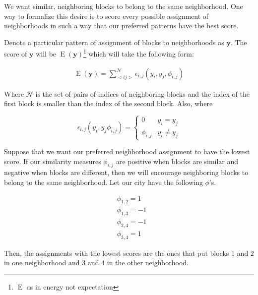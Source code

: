 We want similar, neighboring blocks to belong to the same
neighborhood. One way to formalize this desire is to score every possible
assignment of neighborhoods in such a way that our preferred patterns
have the best score.

Denote a particular pattern of assignment of blocks to neighborhoods
as $\mathbf{y}$.  The score of $\mathbf{y}$ will be
$\operatorname{E}(\mathbf{y})$\footnote{$\operatorname{E}$ as in
  energy not expectation} which will take the following form:

\begin{align}
\operatorname{E}(\mathbf{y}) = \sum_{<i j>}^{\mathcal{N}}\epsilon_{i,j}(y_i,y_j,\phi_{i,j})
\end{align}

Where $\mathcal{N}$ is the set of pairs of indices of neighboring
blocks and the index of the first block is smaller than the index of
the second block. Also, where

\begin{equation}
\epsilon_{i,j}(y_i,y_j\phi_{i,j}) = \begin{cases}
  0 &y_i = y_j \\
  \phi_{i,j} &y_i \neq y_j
\end{cases}
\end{equation}

Suppose that we want our preferred neighborhood assignment to have the
lowest score. If our similarity measures $\phi_{i,j}$ are positive
when blocks are similar and negative when blocks are different, then
we will encourage neighboring blocks to belong to the same
neighborhood. Let our city have the following $\phi$'s.

\begin{align*}
&\phi_{1,2} = 1 \\
&\phi_{1,3} = -1 \\
&\phi_{2,4} = -1 \\
&\phi_{3,4} = 1
\end{align*} 

Then, the assignments with the lowest scores are the ones that put
blocks $1$ and $2$ in one neighborhood and $3$ and $4$ in the other
neighborhood.

